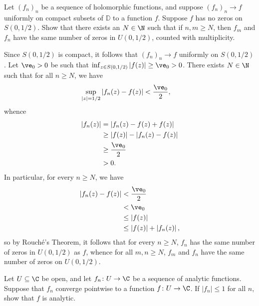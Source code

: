 \documentclass[10pt]{mypackage}
\renewcommand{\D}{\mathbb{D}}
\begin{document}
\begin{problem}[Problem 4]
  Let $\left( f_n \right)_n$ be a sequence of holomorphic functions, and suppose $\left( f_n \right)_n\rightarrow f$ uniformly on compact subsets of $\D$ to a function $f$. Suppose $f$ has no zeros on $S\left(0,1/2\right)$. Show that there exists an $N\in \N$ such that if $n,m\geq N$, then $f_m$ and $f_n$ have the same number of zeros in $U\left(0,1/2\right)$, counted with multiplicity.
\end{problem}
\begin{solution}
  Since $S\left( 0,1/2 \right)$ is compact, it follows that $\left( f_n \right)_n\rightarrow f$ uniformly on $S\left( 0,1/2 \right)$. Let $\ve_0 > 0$ be such that $\inf_{z\in S\left( 0,1/2 \right)}\left\vert f(z) \right\vert \geq \ve_0 > 0$. There exists $N\in \N$ such that for all $n\geq N$, we have
  \begin{align*}
    \sup_{|z| = 1/2}\left\vert f_n(z) - f(z) \right\vert &< \frac{\ve_0}{2},
  \end{align*}
  whence
  \begin{align*}
    \left\vert f_n(z) \right\vert &= \left\vert f_n(z) - f(z) + f(z) \right\vert\\
                                  &\geq \left\vert f(z) \right\vert - \left\vert f_n(z) - f(z) \right\vert\\
                                  &\geq \frac{\ve_0}{2}\\
                                  &> 0.
  \end{align*}
  In particular, for every $n\geq N$, we have
  \begin{align*}
    \left\vert f_n(z) - f(z) \right\vert &< \frac{\ve_0}{2}\\
                                         &< \ve_0\\
                                         &\leq \left\vert f(z) \right\vert\\
                                         &\leq \left\vert f(z) \right\vert + \left\vert f_n(z) \right\vert,
  \end{align*}
  so by Rouché's Theorem, it follows that for every $n\geq N$, $f_n$ has the same number of zeros in $U\left( 0,1/2 \right)$ as $f$, whence for all $m,n\geq N$, $f_m$ and $f_n$ have the same number of zeros on $U\left( 0,1/2 \right)$.
\end{solution}
\begin{problem}[Problem 5]
  Let $U\subseteq \C$ be open, and let $f_n\colon U\rightarrow \C$ be a sequence of analytic functions. Suppose that $f_n$ converge pointwise to a function $f\colon U\rightarrow \C$. If $\left\vert f_n \right\vert\leq 1$ for all $n$, show that $f$ is analytic.
\end{problem}
\end{document}
